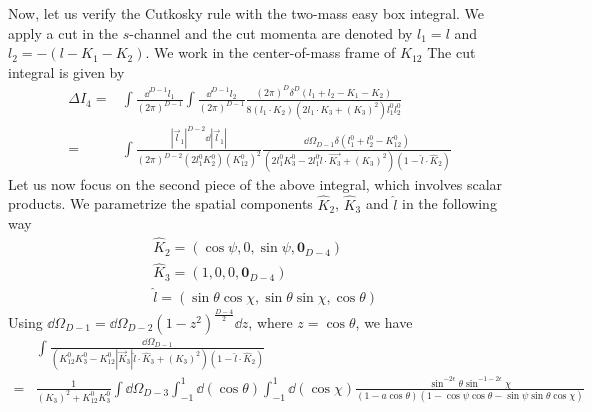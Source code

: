 Now, let us verify the Cutkosky rule with the two-mass easy box integral.
We apply a cut in the $s$-channel and the cut momenta are denoted by $l_1 = l$ and $l_2 = -( l-K_1-K_2)$.
We work in the center-of-mass frame of $K_{12}$
The cut integral is given by
\begin{equation}\label{cuti4}
\begin{split}
\Delta I_4 =&
\int\frac{\dd^{D-1}l_1}{(2\pi)^{D-1}} 
 \int\frac{\dd^{D-1}l_2}{(2\pi)^{D-1}}
\frac{(2\pi)^D\delta^{D}(l_1 + l_2 - K_1- K_2)}{8(l_1\cdot K_2)(2l_1\cdot K_3 + (K_3)^2)l_1^0 l_2^0} 
\\
\iffalse
 = & 
\int\frac{\dd^{D-1}l_1}{(2\pi)^{D-2}} 
\frac{\delta(l_1^0 + l_2^0 - K_1^0 - K_2^0)}{8 l_1^0 l_2^0 (2l_1\cdot K_3 + (K_3)^2)(l_1\cdot K_2)}
\\
\fi
 = & \int\frac{|\vec{l}_1|^{D-2} \dd |\vec{l}_1|}{(2\pi)^{D-2}(2l_1^0 K_2^0)(K_{12}^0)^2}
\frac{\dd \Omega_{D-1} \delta(l_1^0 + l_2^0 - K^0_{12})}{(2l_1^0 K_3^0 - 2l_1^0 \hat{l}\cdot\vec{K_3} + (K_3)^2)(1-\hat{l}\cdot \hat{K}_2)}
\end{split}
\end{equation}
Let us now focus on the second piece of the above integral, which involves scalar products. 
We parametrize the spatial components $\hat{K}_2$, $\hat{K}_3$ and $\hat{l}$ in the following way
\begin{equation}\label{spatial_param}
\begin{split}
& \hat{K}_2 = (\cos\psi, 0, \sin \psi, \mathbf{0}_{D-4})
\\
& \hat{K}_3 = (1,0,0,\mathbf{0}_{D-4})
\\
& \hat{l} = (\sin\theta\cos\chi, \sin\theta\sin\chi,\cos\theta)
\end{split}
\end{equation}
Using $\dd\Omega_{D-1} = \dd \Omega_{D-2}(1-z^2)^{\frac{D-4}{2}}\dd z$, where $z = \cos\theta$, 
we have
\begin{equation}\label{omega11}
\begin{split}
& \int\frac{\dd \Omega_{D-1}}{(K_{12}^0 K_3^0 - K_{12}^0 |\vec{K}_3| \hat{l}\cdot \hat{K}_3 + (K_3)^2)(1-\hat{l}\cdot\hat{K}_2)}
\\
= & \frac{1}{(K_3)^2 + K_{12}^0 K_3^0}\int \dd \Omega_{D-3}
\int_{-1}^1 \dd(\cos\theta)\int_{-1}^1\dd(\cos \chi)\frac{\sin^{-2\epsilon}\theta \sin^{-1-2\epsilon}\chi}{(1-a\cos\theta)(1-\cos\psi\cos\theta  - \sin\psi\sin\theta\cos\chi)}
\end{split}
\end{equation}
